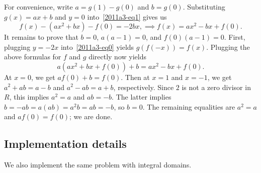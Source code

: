 \documentclass{article}
\begin{document}
For convenience, write $a = g(1) - g(0)$ and $b = g(0)$.
Substituting $g(x) = ax + b$ and $y = 0$ into~\eqref{2011a3-eq1} gives us
\[ f(x) - (ax^2 + bx) - f(0) = -2bx, \implies f(x) = ax^2 - bx + f(0). \]
It remains to prove that $b = 0$, $a(a - 1) = 0$, and $f(0) (a - 1) = 0$.
First, plugging $y = -2x$ into~\eqref{2011a3-eq0} yields $g(f(-x)) = f(x)$.
Plugging the above formulas for $f$ and $g$ directly now yields
\[ a(ax^2 + bx + f(0)) + b = ax^2 - bx + f(0). \]
At $x = 0$, we get $a f(0) + b = f(0)$.
Then at $x = 1$ and $x = -1$, we get $a^2 + ab = a - b$ and $a^2 - ab = a + b$, respectively.
Since $2$ is not a zero divisor in $R$, this implies $a^2 = a$ and $ab = -b$.
The latter implies $b = -ab = a(ab) = a^2 b = ab = -b$, so $b = 0$.
The remaining equalities are $a^2 = a$ and $a f(0) = f(0)$; we are done.



\subsection*{Implementation details}

We also implement the same problem with integral domains.
\end{document}
